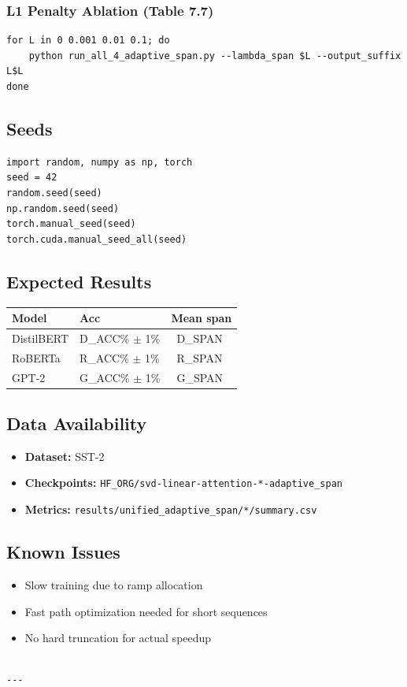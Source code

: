 \subsubsection{L1 Penalty Ablation (Table 7.7)}
\begin{lstlisting}
for L in 0 0.001 0.01 0.1; do
    python run_all_4_adaptive_span.py --lambda_span $L --output_suffix L$L
done
\end{lstlisting}

\subsection{Seeds}

\begin{lstlisting}
import random, numpy as np, torch
seed = 42
random.seed(seed)
np.random.seed(seed)
torch.manual_seed(seed)
torch.cuda.manual_seed_all(seed)
\end{lstlisting}

\subsection{Expected Results}

\begin{table}[H]
\centering
\small
\begin{tabular}{lll}
\toprule
\textbf{Model} & \textbf{Acc} & \textbf{Mean span} \\
\midrule
DistilBERT & {{D\_ACC}}\% $\pm$ 1\% & ~{{D\_SPAN}} \\
RoBERTa & {{R\_ACC}}\% $\pm$ 1\% & ~{{R\_SPAN}} \\
GPT-2 & {{G\_ACC}}\% $\pm$ 1\% & ~{{G\_SPAN}} \\
\bottomrule
\end{tabular}
\end{table}

\subsection{Data Availability}

\begin{itemize}
\item \textbf{Dataset:} SST-2
\item \textbf{Checkpoints:} \texttt{{{HF\_ORG}}/svd-linear-attention-*-adaptive\_span}
\item \textbf{Metrics:} \texttt{results/unified\_adaptive\_span/*/summary.csv}

\end{itemize}
\subsection{Known Issues}

\begin{itemize}
\item Slow training due to ramp allocation
\item Fast path optimization needed for short sequences
\item No hard truncation for actual speedup
\end{itemize}
\begin{lstlisting}

---
\end{lstlisting}